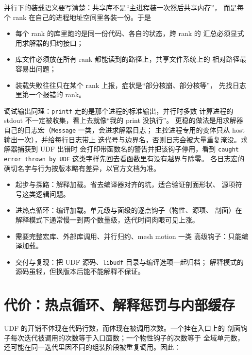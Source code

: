 \documentclass[12pt,a4paper,fontset=fandol]{ctexbook}
\newcommand{\Tp}[1]{\texttt{#1}}
\begin{document}
并行下的装载语义要写清楚：共享库不是``主进程装一次然后共享内存''，
而是每个 rank 在自己的进程地址空间里各装一份。于是
\begin{itemize}
  \item 每个 rank 的库里跑的是同一份代码、各自的状态，跨 rank 的
        汇总必须显式用求解器的归约接口；
  \item 库文件必须放在所有 rank 都能读到的路径上，共享文件系统上的
        相对路径最容易出问题；
  \item 装载失败往往只在某个 rank 上报，症状是``部分核崩、部分核等''，
        先找日志里第一个报错的 rank。
\end{itemize}
调试输出同理：\Tp{printf} 走的是那个进程的标准输出，并行时多数
计算进程的 stdout 不一定被收集，看上去就像``我的 print 没执行''。
更稳的做法是用求解器自己的日志宏（\Tp{Message} 一类，会进求解器日志；
主控进程专用的变体只从 host 输出一次），并给每行日志带上
迭代号与边界名，否则日志会被大量重复淹没。求解器捕获到 UDF 出错时
会打印带函数名的警告并把该钩子停用，看到 \Tp{caught error thrown by UDF}
这类字样先回去看函数里有没有越界与除零。
各日志宏的确切名字与行为按版本略有差异，以官方文档为准。

\begin{compare}[title={解释加载与编译加载的分工}]
\begin{itemize}
  \item 起步与探路：解释加载。省去编译器对齐的坑，适合验证剖面形状、
        源项符号这类逻辑问题。
  \item 进热点循环：编译加载。单元级与面级的逐点钩子（物性、源项、
        剖面）在解释模式下通常慢一到两个数量级，迭代时间肉眼可见上涨。
  \item 需要完整宏库、外部库调用、并行归约、mesh motion 一类
        高级钩子：只能编译加载。
  \item 交付与复现：把 UDF 源码、\Tp{libudf} 目录与编译选项一起归档；
        解释模式的源码虽轻，但换版本后能不能解释不保证。
\end{itemize}
\end{compare}

\section{代价：热点循环、解释惩罚与内部缓存}
\label{sec:ch03-cost}

UDF 的开销不体现在代码行数，而体现在被调用次数。一个挂在入口上的
剖面钩子每次迭代被调用的次数等于入口面数；一个物性钩子的次数等于
全域单元数，还可能在同一迭代里因不同的组装阶段被重复调用。因此：
\end{document}
